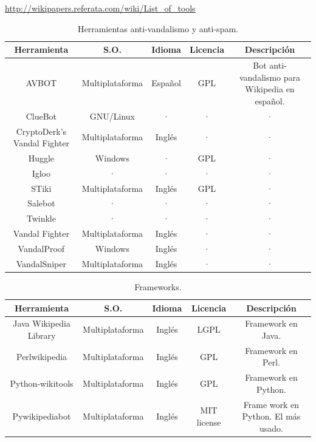 \documentclass[11pt,onecolumn]{article}
\begin{document}
\href{http://wikipapers.referata.com/wiki/List_of_tools}{http://wikipapers.referata.com/wiki/List\_of\_tools}

\begin{table}
\centering
\begin{tabular}{| c | c | c | c | c |}
\hline
\textbf{Herramienta} & \textbf{S.O.} & \textbf{Idioma} & \textbf{Licencia} & \textbf{Descripción} \\
\hline
AVBOT & Multiplataforma & Español & GPL & Bot anti-vandalismo para Wikipedia en español. \\ \hline
ClueBot & GNU/Linux & · & · & · \\ \hline
CryptoDerk's Vandal Fighter & Multiplataforma & Inglés & · & · \\ \hline
Huggle & Windows & · & GPL & · \\ \hline
Igloo & · & · & · & · \\ \hline
STiki & Multiplataforma & Inglés & GPL & · \\ \hline
Salebot & · & · & · & · \\ \hline
Twinkle & · & · & · & · \\ \hline
Vandal Fighter & Multiplataforma & Inglés & · & · \\ \hline
VandalProof & Windows & Inglés & · & · \\ \hline
VandalSniper & Multiplataforma & Inglés & · & · \\ \hline
\end{tabular}
\caption{Herramientas anti-vandalismo y anti-spam.}
\label{tab:vandaltoolstable}
\end{table}


\begin{table}
\centering
\begin{tabular}{| c | c | c | c | c |}
\hline
\textbf{Herramienta} & \textbf{S.O.} & \textbf{Idioma} & \textbf{Licencia} & \textbf{Descripción} \\
\hline
Java Wikipedia Library & Multiplataforma & Inglés & LGPL & Framework en Java. \\ \hline
Perlwikipedia & Multiplataforma & Inglés & GPL & Framework en Perl. \\ \hline
Python-wikitools & Multiplataforma & Inglés & GPL & Framework en Python. \\ \hline
Pywikipediabot & Multiplataforma & Inglés & MIT license & Frame work en Python. El más usado. \\ \hline
\end{tabular}
\caption{Frameworks.}
\label{tab:frameworkstable}
\end{table}
\end{document}
